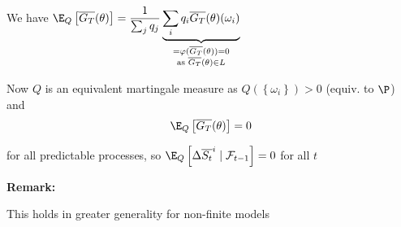 \begin{prf}[]{}
    \par\bigskip
    \noindent We have $\E_Q\left[\overline{G_T}(\theta)\right] = \dfrac{1}{\sum_j q_j}\underbrace{\sum_iq_i\overline{G_T}(\theta)(\omega_i)}_{\substack{=\varphi(\overline{G_T}(\theta))=0\\\text{as }\overline{G_T}(\theta)\in L}}$
    \par\bigskip
  \noindent Now $Q$ is an equivalent martingale  measure as $Q\left(\left\{\omega_i\right\}\right)>0$ (equiv. to $\P$) and 
  \begin{equation*}
    \begin{gathered}
      \E_Q\left[\overline{G_T}(\theta)\right] = 0
    \end{gathered}
  \end{equation*}\par
  \noindent for all predictable processes, so $\E_Q\left[\Delta\overline{S_t}^i\mid\mathcal{F}_{t-1}\right] = 0$ for all $t$
\end{prf}
\par\bigskip
\noindent\textbf{Remark:}\par
\noindent This holds in greater generality for non-finite models
